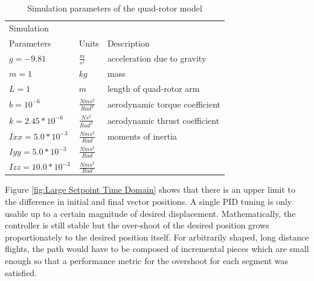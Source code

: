\begin{table}
\label{table:params}
\begin{doublespace}
\centering
\begin{tabular}{l l l}
    Simulation\\ Parameters & Units & Description\\
    \hline
    $g = -9.81            $& $ \frac{m}{s^2}          $ & acceleration due to gravity\\
    $m = 1                $& $ kg                      $ & mass\\
    $L = 1                $& $ m                       $ & length of quad-rotor arm\\
    $b = 10^{-6}          $& $ \frac{N m s^2}{Rad^2}  $ & aerodynamic torque coefficient\\
    $k = 2.45*10^{-6}     $& $ \frac{N s^2}{Rad^2}    $ & aerodynamic thrust coefficient\\
    $Ixx = 5.0*10^{-3}    $& $ \frac{N m s^2}{Rad}    $ & moments of inertia \\
    $Iyy = 5.0*10^{-3}    $& $ \frac{N m s^2}{Rad}    $ & \\
    $Izz = 10.0*10^{-3}   $& $ \frac{N m s^2}{Rad}    $ & \\
    \hline
\end{tabular}
\end{doublespace}
\caption[Simulation parameters of the quad-rotor model]{Simulation parameters of the quad-rotor model}
\end{table}
Figure \ref{fig:Large Setpoint Time Domain} shows that there is an upper limit to the difference in initial and final vector positions. A single PID tuning is only usable up to a certain magnitude of desired displacement. Mathematically, the controller is still stable but the over-shoot of the desired position grows proportionately to the desired position itself. For arbitrarily shaped, long distance flights, the path would have to be composed of incremental pieces which are small enough so that a performance metric for the overshoot for each segment was satisfied.
